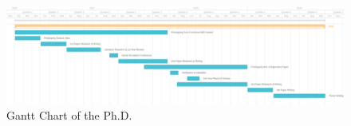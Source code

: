 \begin{landscape}
	\centering
	
	\begin{figure}
	\centering
	\includegraphics[width=1.5\textwidth, height=0.8\textwidth, angle=0]{./fig/phd_gantt.png}
	\caption{Gantt Chart of the Ph.D.}
	\label{fig:gantt}
\end{figure}
\end{landscape}